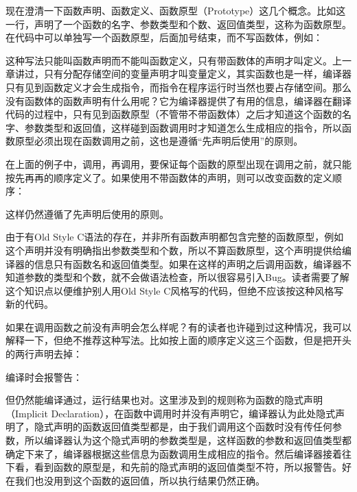 现在澄清一下函数声明、函数定义、函数原型（Prototype）这几个概念。比如这一行，声明了一个函数的名字、参数类型和个数、返回值类型，这称为函数原型。在代码中可以单独写一个函数原型，后面加\BookCode{;\BookSplit{}}号结束，而不写函数体，例如：




这种写法只能叫函数声明而不能叫函数定义，只有带函数体的声明才叫定义。上一章讲过，只有分配存储空间的变量声明才叫变量定义，其实函数也是一样，编译器只有见到函数定义才会生成指令，而指令在程序运行时当然也要占存储空间。那么没有函数体的函数声明有什么用呢？它为编译器提供了有用的信息，编译器在翻译代码的过程中，只有见到函数原型（不管带不带函数体）之后才知道这个函数的名字、参数类型和返回值，这样碰到函数调用时才知道怎么生成相应的指令，所以函数原型必须出现在函数调用之前，这也是遵循“先声明后使用”的原则。



在上面的例子中，调用，再调用，要保证每个函数的原型出现在调用之前，就只能按先再再的顺序定义了。如果使用不带函数体的声明，则可以改变函数的定义顺序：




这样仍然遵循了先声明后使用的原则。



由于有Old Style C语法的存在，并非所有函数声明都包含完整的函数原型，例如这个声明并没有明确指出参数类型和个数，所以不算函数原型，这个声明提供给编译器的信息只有函数名和返回值类型。如果在这样的声明之后调用函数，编译器不知道参数的类型和个数，就不会做语法检查，所以很容易引入Bug。读者需要了解这个知识点以便维护别人用Old Style C风格写的代码，但绝不应该按这种风格写新的代码。



如果在调用函数之前没有声明会怎么样呢？有的读者也许碰到过这种情况，我可以解释一下，但绝不推荐这种写法。比如按上面的顺序定义这三个函数，但是把开头的两行声明去掉：




编译时会报警告：




但仍然能编译通过，运行结果也对。这里涉及到的规则称为函数的隐式声明（Implicit Declaration），在函数中调用时并没有声明它，编译器认为此处隐式声明了，隐式声明的函数返回值类型都是，由于我们调用这个函数时没有传任何参数，所以编译器认为这个隐式声明的参数类型是，这样函数的参数和返回值类型都确定下来了，编译器根据这些信息为函数调用生成相应的指令。然后编译器接着往下看，看到函数的原型是，和先前的隐式声明的返回值类型不符，所以报警告。好在我们也没用到这个函数的返回值，所以执行结果仍然正确。

